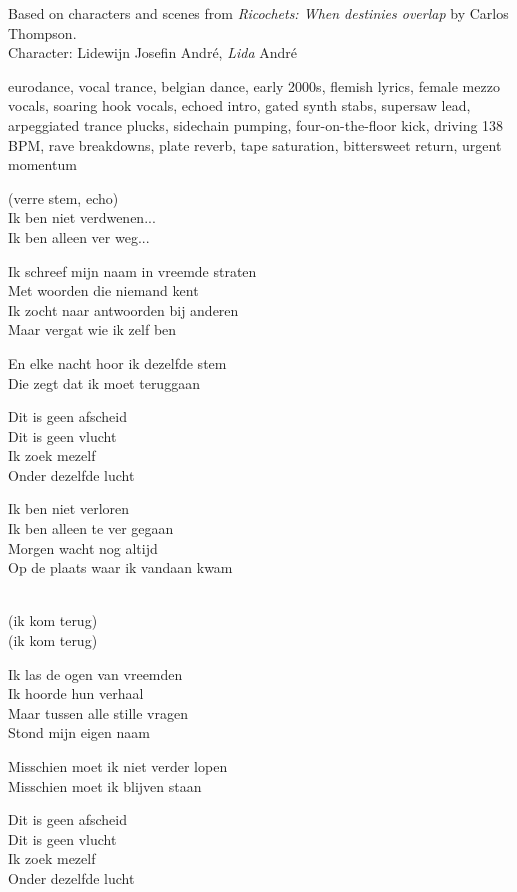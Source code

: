 
\label{sec:sabbatical}
\begin{notes}
Based on characters and scenes from \emph{Ricochets: When destinies overlap} by Carlos Thompson.\\
Character: Lidewijn Josefin André, \emph{Lida} André
\end{notes}
\begin{style}
eurodance, vocal trance, belgian dance, early 2000s, flemish lyrics, female mezzo vocals, soaring hook vocals, echoed intro, gated synth stabs, supersaw lead, arpeggiated trance plucks, sidechain pumping, four-on-the-floor kick, driving 138 BPM, rave breakdowns, plate reverb, tape saturation, bittersweet return, urgent momentum
\end{style}
\begin{lyrics}
(verre stem, echo)\\
Ik ben niet verdwenen...\\
Ik ben alleen ver weg...

Ik schreef mijn naam in vreemde straten\\
Met woorden die niemand kent\\
Ik zocht naar antwoorden bij anderen\\
Maar vergat wie ik zelf ben

En elke nacht hoor ik dezelfde stem\\
Die zegt dat ik moet teruggaan

Dit is geen afscheid\\
Dit is geen vlucht\\
Ik zoek mezelf\\
Onder dezelfde lucht

Ik ben niet verloren\\
Ik ben alleen te ver gegaan\\
Morgen wacht nog altijd\\
Op de plaats waar ik vandaan kwam

\\
(ik kom terug)\\
(ik kom terug)

Ik las de ogen van vreemden\\
Ik hoorde hun verhaal\\
Maar tussen alle stille vragen\\
Stond mijn eigen naam

Misschien moet ik niet verder lopen\\
Misschien moet ik blijven staan

Dit is geen afscheid\\
Dit is geen vlucht\\
Ik zoek mezelf\\
Onder dezelfde lucht
\end{lyrics}

